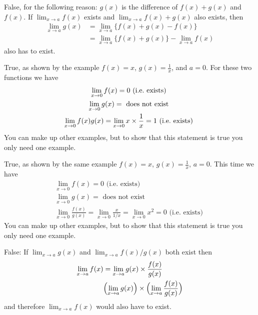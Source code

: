 \item[{\bfseries(III14.21a)}]

False, for the following reason:  $g(x)$ is the difference of $f(x)+g(x)$ and
$f(x)$.  If $\lim_{x\to a} f(x)$ exists and $\lim_{x\to a} f(x) + g(x)$ also exists, then
\begin{align*}
  \lim_{x\to a} g(x) &= \lim_{x\to a} \bigl\{f(x) + g(x) - f(x)\bigr\}\\
  &= \lim_{x\to a} \bigl\{f(x) + g(x)\bigr\} - \lim_{x\to a} f(x)
\end{align*}
also has to exist.
\bigskip

\item[{\bfseries(III14.21b)}]

True, as shown by the example $f(x) = x$, $g(x) = \frac{1}{x}$, and $a=0$.
For these two functions we have
\begin{gather*}
  \lim_{x\to 0} f(x) = 0 \text{ (i.e.\ exists) } \\
  \lim_{x\to 0} g(x) = \text{ does not exist } \\
  \lim_{x\to 0} f(x) g(x) = \lim_{x\to 0} x\times\frac1x = 1 \text{ (i.e.\
  exists) }
\end{gather*}
You can make up other examples, but to show that this statement is true you only
need one example.
\bigskip

\item[{\bfseries(III14.21c)}]

True, as shown by the same example $f(x) = x$, $g(x) = \frac{1}{x}$, $a=0$.
This time we have
\begin{gather*}
  \lim_{x\to 0} f(x) = 0 \text{ (i.e.\ exists) } \\
  \lim_{x\to 0} g(x) = \text{ does not exist } \\
  \lim_{x\to 0} \frac{f(x)}{g(x)} = \lim_{x\to 0} \frac{x}{1/x} =\lim_{x\to0}
  x^2 = 0 \text{ (i.e.\ exists) }
\end{gather*}
You can make up other examples, but to show that this statement is true you only
need one example.
\bigskip

\item[{\bfseries(III14.21d)}]

False:  If $\lim_{x\to a} g(x)$ and $\lim_{x\to a} f(x)/g(x)$ both exist then
\begin{align*}
  \lim_{x\to a} f(x) &=
  \lim_{x\to a} g(x) \times \frac{f(x)}{g(x)} \\
  &\Bigl(\lim_{x\to a} g(x)\Bigr) \times \Bigl(\lim_{x\to a} \frac{f(x)}{g(x)}\Bigr) \\
\end{align*}
and therefore $\lim_{x\to a} f(x)$ would also have to exist.
\bigskip

